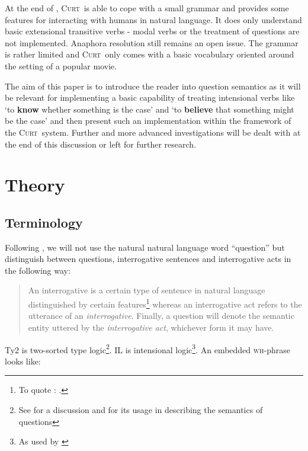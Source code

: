 \documentclass[a4paper]{article}
\newcommand{\abbr}{\textsf} %
\newcommand{\stress}{\textbf} %
\newcommand{\term}{\textsf} %
\newcommand{\pn}{\textsc} %
\newcommand{\wh}{\textsc{wh}} %
\newcommand{\curt}{\pn{Curt}\mbox{ }}
\begin{document}
At the end of \cite{blackburnbos:cl1}, \curt is able to cope with a small
grammar and provides some features for interacting with humans in natural
language. It does only understand basic extensional transitive verbs - modal
verbs or the treatment of questions are not implemented. Anaphora resolution
still remains an open issue. The grammar is rather limited and \curt only comes
with a basic vocabulary oriented around the setting of a popular movie.

The aim of this paper is to introduce the reader into question semantics as it
will be relevant for implementing a basic capability of treating intensional
verbs like `to \stress{know} whether something is the case' and `to
\stress{believe} that something might be the case' and then present such an
implementation within the framework of the \curt system. Further and more
advanced investigations will be dealt with at the end of this discussion or left
for further research.

\section{Theory}

\subsection{Terminology}

Following \cite{gs:q}, we will not use the natural natural language word
``question'' but distinguish between \term{questions},
\term{interrogative sentences} and \term{interrogative acts} in the following
way:

\begin{quote}
  An \term{interrogative} is a certain type of sentence in natural language
  distinguished by certain features\footnote{To quote \cite{gs:q}: .}
  whereas an \term{interrogative act} refers to the utterance of an
  \emph{interrogative}. Finally, a 
  \term{question} will denote the semantic entity uttered by the
  \emph{interrogative act}, whichever form it may have.
\end{quote}

\abbr{Ty2} is two-sorted type logic\footnote{See \cite{gallin:ty2} for a
discussion and \cite{gs:sqpa} for its usage in describing the semantics of
questions}. \abbr{IL} is intensional logic\footnote{As used by \cite{ptq}}. 
An embedded \wh-phrase looks
like:%
\end{document}
